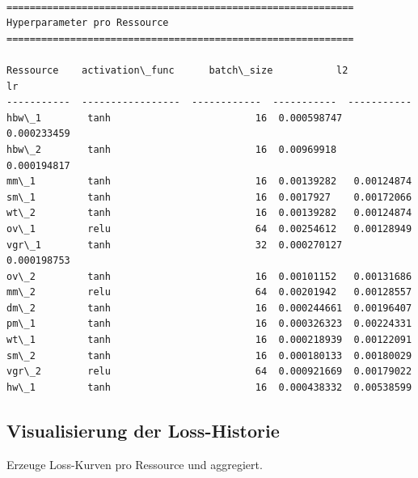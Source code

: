 \documentclass[11pt]{article}
\begin{document}
    \begin{Verbatim}[commandchars=\\\{\}]

============================================================
Hyperparameter pro Ressource
============================================================

Ressource    activation\_func      batch\_size           l2           lr
-----------  -----------------  ------------  -----------  -----------
hbw\_1        tanh                         16  0.000598747  0.000233459
hbw\_2        tanh                         16  0.00969918   0.000194817
mm\_1         tanh                         16  0.00139282   0.00124874
sm\_1         tanh                         16  0.0017927    0.00172066
wt\_2         tanh                         16  0.00139282   0.00124874
ov\_1         relu                         64  0.00254612   0.00128949
vgr\_1        tanh                         32  0.000270127  0.000198753
ov\_2         tanh                         16  0.00101152   0.00131686
mm\_2         relu                         64  0.00201942   0.00128557
dm\_2         tanh                         16  0.000244661  0.00196407
pm\_1         tanh                         16  0.000326323  0.00224331
wt\_1         tanh                         16  0.000218939  0.00122091
sm\_2         tanh                         16  0.000180133  0.00180029
vgr\_2        relu                         64  0.000921669  0.00179022
hw\_1         tanh                         16  0.000438332  0.00538599
    \end{Verbatim}

    \subsection{Visualisierung der
Loss-Historie}\label{visualisierung-der-loss-historie}

Erzeuge Loss-Kurven pro Ressource und aggregiert.
\end{document}
